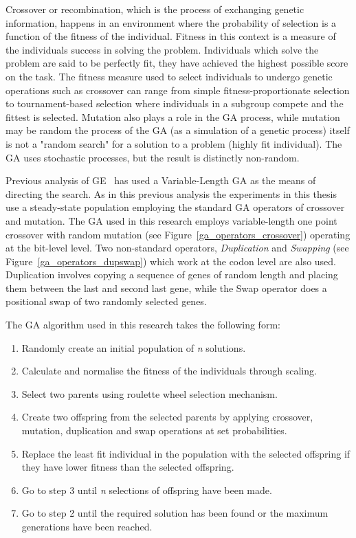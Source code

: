 Crossover or recombination, which is the process of exchanging genetic information, happens in an environment where the probability of selection is a function of the fitness of the individual. Fitness in this context is a measure of the individuals success in solving the problem. Individuals which solve the problem are said to be perfectly fit, they have achieved the highest possible score on the task.
The fitness measure used to select individuals to undergo genetic operations such as crossover can range from simple fitness-proportionate selection to tournament-based selection where individuals in a subgroup compete and the fittest is selected. 
Mutation also plays a role in the GA process, while mutation may be random the process of the GA (as a simulation of a genetic process) itself is not a "random search" for a solution to a problem (highly fit individual). The GA uses stochastic processes, but the result is distinctly non-random.

\label{ga_operators}Previous analysis of GE~\cite{ieee2001} has used a Variable-Length GA as the means of directing the search. As in this previous analysis the experiments in this thesis use a steady-state population employing the standard GA operators of crossover and mutation.  The GA used in this research employs variable-length one point crossover with random mutation (see Figure~\ref{ga_operators_crossover})  operating at the bit-level level. Two non-standard operators, \label{sec:duplicate}\emph{Duplication} and \emph{Swapping}  (see Figure~\ref{ga_operators_dupswap})  which work at the codon level are also used. Duplication involves copying a sequence of genes of random length and placing them  between the last and second last gene, while the Swap operator does a positional swap of two randomly selected genes. 

The GA algorithm used in this research takes the following form: 

\begin{center}
\begin{enumerate}
\item Randomly create an initial population of \emph{n} solutions.
\item Calculate and normalise the fitness of the individuals through scaling.
\item Select two parents using roulette wheel selection mechanism.
\item Create two offspring from the selected parents by applying crossover, mutation, duplication and swap operations at set probabilities.
\item Replace the least fit individual in the population with the selected offspring if they have lower fitness than the selected offspring.
\item Go to step 3 until \emph{n} selections of offspring have been made.
\item Go to step 2 until the required solution has been found or the maximum generations have been reached. 
\end{enumerate}
\end{center}



